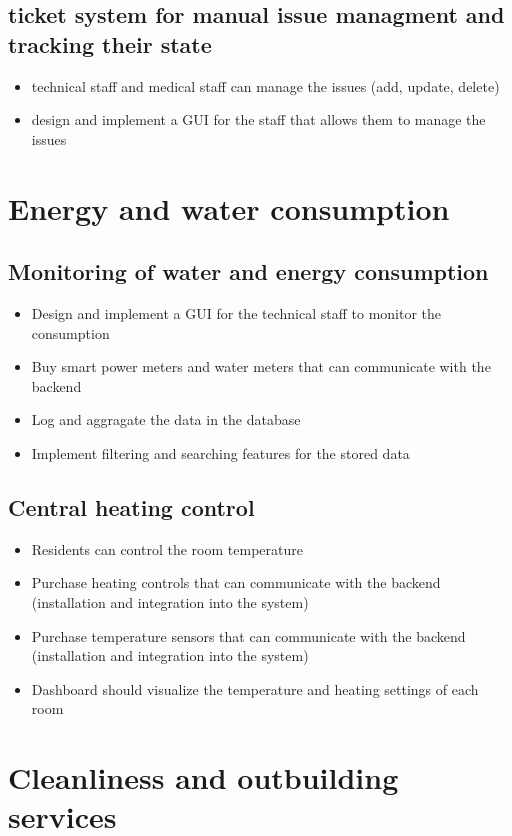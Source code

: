 \documentclass
[
 12pt, %
       DIV12,
       a4paper, %
       oneside, %
       titlepage, %
       parskip=half, %
       headings=normal, %
       listof=totoc, %
       bibliography=totoc, %
       index=totoc, %
       captions=tableheading, %
       ]{scrreprt}
\begin{document}
\section{ticket system for manual issue managment and tracking their state}
\label{sec:org5253110}
\begin{itemize}
\item technical staff and medical staff can manage the issues (add, update, delete)
\item design and implement a GUI for the staff that allows them to manage the issues
\end{itemize}


\chapter{Energy and water consumption}
\label{sec:org641eca5}
\section{Monitoring of water and energy consumption}
\label{sec:org8d5461b}
\begin{itemize}
\item Design and implement a GUI for the technical staff to monitor the consumption
\item Buy smart power meters and water meters that can communicate with the backend
\item Log and aggragate the data in the database
\item Implement filtering and searching features for the stored data
\end{itemize}
\section{Central heating control}
\label{sec:orgce3cc51}
\begin{itemize}
\item Residents can control the room temperature
\item Purchase heating controls that can communicate with the backend (installation and integration into  the system)
\item Purchase temperature sensors that can communicate with the backend (installation and integration into  the system)
\item Dashboard should visualize the temperature and heating settings of each room
\end{itemize}
\chapter{Cleanliness and outbuilding services}
\label{sec:org5fc046d}
\end{document}
